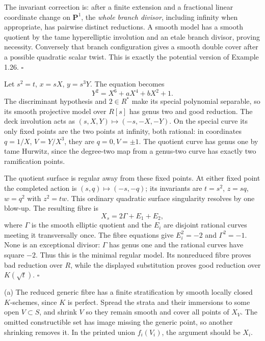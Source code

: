\documentclass[11pt]{article}
\let\chapterexercise\exercise
\renewcommand{\exercise}[2]{\Needspace{8\baselineskip}\chapterexercise{#1}{#2}}
\begin{document}
The invariant correction is: after a finite extension and a fractional linear coordinate change on $\mathbf P^1$, the \emph{whole branch divisor}, including infinity when appropriate, has pairwise distinct reductions. A smooth model has a smooth quotient by the tame hyperelliptic involution and an etale branch divisor, proving necessity. Conversely that branch configuration gives a smooth double cover after a possible quadratic scalar twist. This is exactly the potential version of Example 1.26. \hfill$\square$

\pf Let $s^2=t$, $x=sX$, $y=s^3Y$. The equation becomes
\[ Y^2=X^6+aX^4+bX^2+1. \]
The discriminant hypothesis and $2\in R^*$ make its special polynomial separable, so its smooth projective model over $R[s]$ has genus two and good reduction. The deck involution acts as $(s,X,Y)\mapsto(-s,-X,-Y)$. On the special curve its only fixed points are the two points at infinity, both rational: in coordinates $q=1/X$, $V=Y/X^3$, they are $q=0,V=\pm1$. The quotient curve has genus one by tame Hurwitz, since the degree-two map from a genus-two curve has exactly two ramification points.

The quotient surface is regular away from these fixed points. At either fixed point the completed action is $(s,q)\mapsto(-s,-q)$; its invariants are $t=s^2$, $z=sq$, $w=q^2$ with $z^2=tw$. This ordinary quadratic surface singularity resolves by one blow-up. The resulting fibre is
\[ X_s=2\Gamma+E_1+E_2, \]
where $\Gamma$ is the smooth elliptic quotient and the $E_i$ are disjoint rational curves meeting it transversally once. The fibre equations give $E_i^2=-2$ and $\Gamma^2=-1$. None is an exceptional divisor: $\Gamma$ has genus one and the rational curves have square $-2$. Thus this is the minimal regular model. Its nonreduced fibre proves bad reduction over $R$, while the displayed substitution proves good reduction over $K(\sqrt t)$. \hfill$\square$

\pf (a) The reduced generic fibre has a finite stratification by smooth locally closed $K$-schemes, since $K$ is perfect. Spread the strata and their immersions to some open $V\subset S$, and shrink $V$ so they remain smooth and cover all points of $X_V$. The omitted constructible set has image missing the generic point, so another shrinking removes it. In the printed union $f_i(V_i)$, the argument should be $X_i$.
\end{document}
